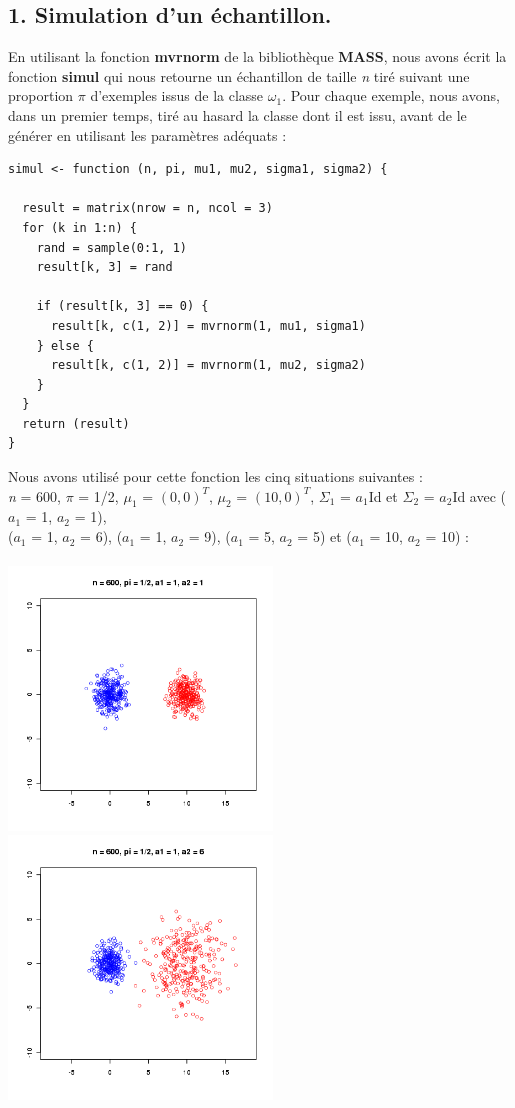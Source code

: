 \documentclass[a4paper, 10pt]{article}
\begin{document}
\subsection*{1. Simulation d'un échantillon.}
En utilisant la fonction \textbf{mvrnorm} de la bibliothèque \textbf{MASS}, nous avons écrit la fonction \textbf{simul} qui nous retourne
un échantillon de taille \textit{n} tiré suivant une proportion $\pi$ d'exemples issus de la classe $\omega_{1}$.
Pour chaque exemple, nous avons, dans un premier temps, tiré au hasard la classe dont il est issu,
avant de le générer en utilisant les paramètres adéquats :\\
\begin{verbatim}
simul <- function (n, pi, mu1, mu2, sigma1, sigma2) {

  result = matrix(nrow = n, ncol = 3)
  for (k in 1:n) {
    rand = sample(0:1, 1)
    result[k, 3] = rand

    if (result[k, 3] == 0) {
      result[k, c(1, 2)] = mvrnorm(1, mu1, sigma1)
    } else {
      result[k, c(1, 2)] = mvrnorm(1, mu2, sigma2)
    }
  }
  return (result)
}
\end{verbatim}
\newpage
\noindent
Nous avons utilisé pour cette fonction les cinq situations suivantes :\\
\textit{n} = 600, $\pi$ = 1/2, $\mu_{1}$ = $(0, 0)^{T}$, $\mu_{2}$ = $(10, 0)^{T}$, $\Sigma_{1}$ = \textit{$a_{1}$}Id et
$\Sigma_{2}$ = \textit{$a_{2}$}Id avec (\textit{$a_{1}$} = 1, \textit{$a_{2}$} = 1),\\(\textit{$a_{1}$} = 1, \textit{$a_{2}$} = 6),
(\textit{$a_{1}$} = 1, \textit{$a_{2}$} = 9), (\textit{$a_{1}$} = 5, \textit{$a_{2}$} = 5) et (\textit{$a_{1}$} = 10, \textit{$a_{2}$} = 10) :\\ \\
\includegraphics[height = 7cm, width = 7cm]{plots/plot_simul_1.png}
\includegraphics[height = 7cm, width = 7cm]{plots/plot_simul_2.png}\\
\end{document}
